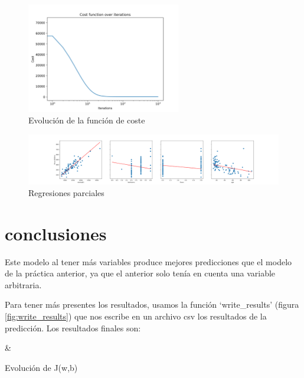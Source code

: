\documentclass[6pt]{../../shared/AiTex}
\begin{document}
\begin{figure}[H]
    \centering
    \includegraphics[width=0.6\textwidth]{./images/cost_function.png}
    \caption{Evolución de la función de coste}
    \label{fig:cost}
\end{figure}

\begin{figure}[H]
    \centering
    \includegraphics[width=\textwidth]{./images/partial_regression.png}
    \caption{Regresiones parciales}
    \label{fig:reg_parciales}
\end{figure}

\section{conclusiones}

Este modelo al tener más variables produce mejores predicciones que el modelo de la práctica anterior, ya que el anterior solo tenía en cuenta una variable arbitraria.

Para tener más presentes los resultados, usamos la función `write\_results' (figura \ref{fig:write_results}) que nos escribe en un archivo csv los resultados de la predicción. Los resultados finales son:

\begin{table}[H]
    \centering
    {\casos & \iterativo}
    \caption{Evolución de J(w,b)}
    \label{table:j_history}
\end{table}
\end{document}

